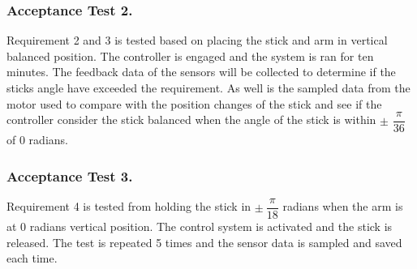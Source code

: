 \subsubsection*{Acceptance Test 2.}

\forceindent Requirement 2 and 3 is tested based on placing the stick and arm in vertical balanced position. The controller is engaged and the system is ran for ten minutes. The feedback data of the sensors will be collected to determine if the sticks angle have exceeded the requirement. As well is the sampled data from the motor used to compare with the position changes of the stick and see if the controller consider the stick balanced when the angle of the stick is within $\pm$ $\dfrac{\pi}{36}$ of 0 radians. 

\subsubsection*{Acceptance Test 3.}
\forceindent Requirement 4 is tested from holding the stick in $\pm\ \dfrac{\pi}{18}$ radians when the arm is at 0 radians vertical position. The control system is activated and the stick is released. The test is repeated 5 times and the sensor data is sampled and saved each time.


